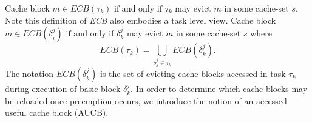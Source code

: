 \noindent Cache block \begin{math}m \in \textit{ECB}(\tau_{k})\textrm{ if and only if }\tau_{k}\end{math} may evict $m$ in some cache-set $s$.  Note this definition of \textit{ECB} also embodies a task level view.  Cache block \begin{math}m \in \textit{ECB}(\delta_{i}^{j})\textrm{ if and only if } \delta_{k}^{j}\end{math} may evict $m$ in some cache-set $s$ where
\begin{equation}\label{eqn:ecb-task}
    \textit{ECB}(\tau_{k}) = \bigcup_{\delta_{k}^{j} \in \tau_{k}} \textit{ECB}(\delta_{k}^{j}).
\end{equation}
\noindent The notation \begin{math}\textit{ECB}(\delta_{k}^{j})\end{math} is the set of evicting cache blocks accessed in task \begin{math}\tau_{k}\end{math} during execution of basic block \begin{math}\delta_{k}^{j}\end{math}.  In order to determine which cache blocks may be reloaded once preemption occurs, we introduce the notion of an accessed useful cache block (AUCB).
%
%
%
